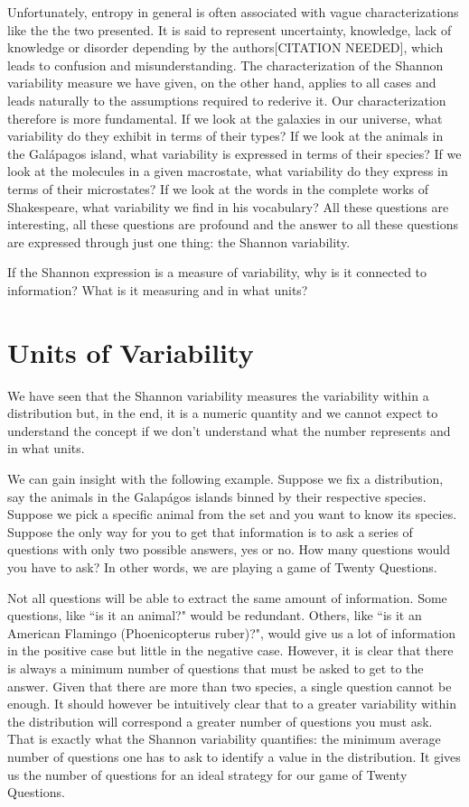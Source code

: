 \documentclass{article}
\begin{document}
Unfortunately, entropy in general is often associated with vague characterizations like the the two presented. It is said to represent uncertainty, knowledge, lack of knowledge or disorder depending by the authors[CITATION NEEDED], which leads to confusion and misunderstanding.  The characterization of the Shannon variability measure we have given, on the other hand, applies to all cases and leads naturally to the assumptions required to rederive it. Our characterization therefore is more fundamental. If we look at the galaxies in our universe, what variability do they exhibit in terms of their types? If we look at the animals in the Gal\'{a}pagos island, what variability is expressed in terms of their species? If we look at the molecules in a given macrostate, what variability do they express in terms of their microstates? If we look at the words in the complete works of Shakespeare, what variability we find in his vocabulary? All these questions are interesting, all these questions are profound and the answer to all these questions are expressed through just one thing: the Shannon variability.

If the Shannon expression is a measure of variability, why is it connected to information? What is it measuring and in what units?

\section{Units of Variability\label{uv}}



We have seen that the Shannon variability measures the variability within a distribution but, in the end, it is a numeric quantity and we cannot expect to understand the concept if we don't understand what the number represents and in what units.

We can gain insight with the following example. Suppose we fix a distribution, say the animals in the Galap\'{a}gos islands binned by their respective species. Suppose we pick a specific animal from the set and you want to know its species. Suppose the only way for you to get that information is to ask a series of questions with only two possible answers, yes or no. How many questions would you have to ask? In other words, we are playing a game of Twenty Questions.

Not all questions will be able to extract the same amount of information. Some questions, like ``is it an animal?" would be redundant. Others, like ``is it an American Flamingo (Phoenicopterus ruber)?", would give us a lot of information in the positive case but little in the negative case. However, it is clear that there is always a minimum number of questions that must be asked to get to the answer. Given that there are more than two species, a single question cannot be enough. It should however be intuitively clear that to a greater variability within the distribution will correspond a greater number of questions you must ask. That is exactly what the Shannon variability quantifies: the minimum average number of questions one has to ask to identify a value in the distribution. It gives us the number of questions for an ideal strategy for our game of Twenty Questions.
\end{document}
